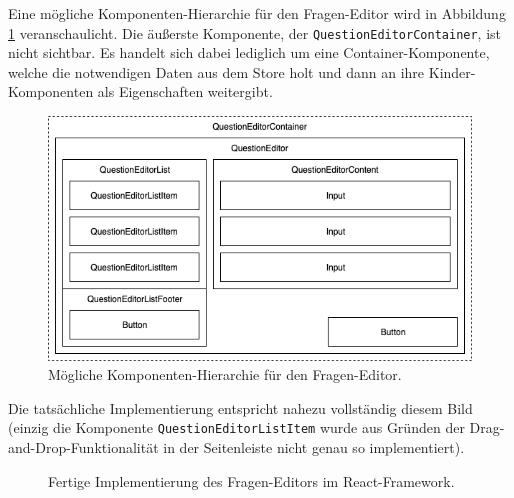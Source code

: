 Eine mögliche Komponenten-Hierarchie für den Fragen-Editor wird in Abbildung \ref{abb:komponenten_hierarchie} veranschaulicht. Die äußerste Komponente, der \texttt{QuestionEditorContainer}, ist nicht sichtbar. Es handelt sich dabei lediglich um eine Container-Komponente, welche die notwendigen Daten aus dem Store holt und dann an ihre Kinder-Komponenten als Eigenschaften weitergibt.

\begin{figure}[H]
    \includegraphics[width=\textwidth]{chapter/entwurf/bilder/Component_Hierarchy.png}
    \centering
    \caption[Komponenten-Hierarchie des Fragen-Editors]{Mögliche Komponenten-Hierarchie für den Fragen-Editor.}
    \label{abb:komponenten_hierarchie}
\end{figure}

Die tatsächliche Implementierung entspricht nahezu vollständig diesem Bild (einzig die Komponente \texttt{QuestionEditorListItem} wurde aus Gründen der Drag-and-Drop-Funktionalität in der Seitenleiste nicht genau so implementiert).


\begin{figure}[H]
    \centering
    \setlength{\fboxsep}{0pt}
    \setlength{\fboxrule}{0.5pt}
    \caption[Fertiger Fragen-Editor in Weclare]{Fertige Implementierung des Fragen-Editors im React-Framework.}
    \label{abb:weclare_editor}
\end{figure}

